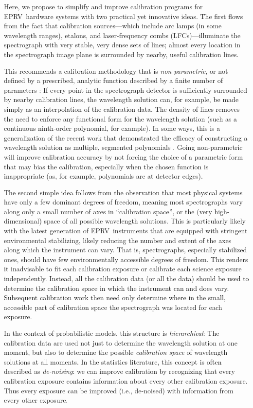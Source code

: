\documentclass[modern]{aastex63}
\newcommand{\acronym}[1]{{\small{#1}}}
\newcommand{\eprv}{\acronym{EPRV}}
\newcommand{\lfc}{\acronym{LFC}}
\begin{document}
Here, we propose to simplify and improve calibration programs for \eprv\ hardware systems with two practical yet innovative ideas.  The first flows from the fact that calibration sources---which include arc lamps (in some wavelength ranges), etalons, and laser-frequency combs (\lfc s)---illuminate the spectrograph with very stable, very dense sets of lines; almost every location in the spectrograph image plane is surrounded by nearby, useful calibration lines.

This recommends a calibration methodology that is \emph{non-parametric}, or not defined by a prescribed, analytic function described by a finite number of parameters :  If every point in the spectrograph detector is sufficiently surrounded by nearby calibration lines, the wavelength solution can, for example, be made simply as an interpolation of the calibration data.  The density of lines removes the need to enforce any functional form for the wavelength solution (such as a continuous ninth-order polynomial, for example).  In some ways, this is a generalization of the recent work that demonstrated the efficacy of constructing a wavelength solution as multiple, segmented polynomials \citep{milakovic2020}.  Going non-parametric will improve calibration accuracy by not forcing the choice of a parametric form that may bias the calibration, especially when the chosen function is inappropriate (as, for example, polynomials are at detector edges).

The second simple idea follows from the observation that most physical systems have only a few dominant degrees of freedom, meaning most spectrographs vary along only a small number of axes in ``calibration space'', or the (very high-dimensional) space of all possible wavelength solutions.  This is particularly likely with the latest generation of \eprv\ instruments that are equipped with stringent environmental stabilizing, likely reducing the number and extent of the axes along which the instrument can vary.  That is, spectrographs, especially stabilized ones, should have few environmentally accessible degrees of freedom.  This renders it inadvisable to fit each calibration exposure or calibrate each science exposure independently.  Instead, all the calibration data (or all the data) should be used to determine the calibration space in which the instrument can and does vary.  Subsequent calibration work then need only determine where in the small, accessible part of calibration space the spectrograph was located for each exposure.

In the context of probabilistic models, this structure is \emph{hierarchical}:  The calibration data are used not just to determine the wavelength solution at one moment, but also to determine the possible \emph{calibration space} of wavelength solutions at all moments.  In the statistics literature, this concept is often described as \emph{de-noising}:  we can improve calibration by recognizing that every calibration exposure contains information about every other calibration exposure.  Thus every exposure can be improved (i.e., de-noised) with information from every other exposure.
\end{document}
